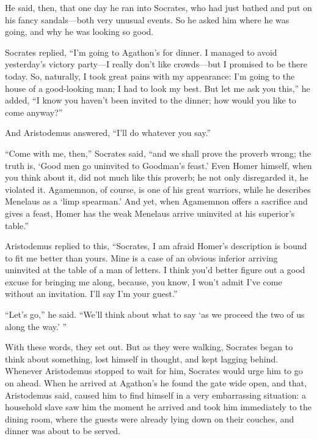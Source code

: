 He said, then, that one day he ran into Socrates, who had just bathed
and put on his fancy sandals---both very unusual events. So he asked him
where he was going, and why he was looking so good.

Socrates replied, “I'm going to Agathon's for dinner. I managed to avoid
yesterday's victory party---I really don't like crowds---but I promised
to be there today. So, naturally, I took great pains with my appearance:
I'm going to the house of a good-looking man; I had to look my best. But
let me ask you this,” he added, “I know you haven't been invited to the
dinner; how would you like to come anyway?”

And Aristodemus answered, “I'll do whatever you say.”

“Come with me, then,” Socrates said, “and we shall prove the proverb
wrong; the truth is, ‘Good men go uninvited to Goodman's
feast.' Even Homer
himself, when you think about it, did not much like this proverb;
he not only disregarded it, he violated it. Agamemnon, of
course, is one of his great warriors, while he describes Menelaus as a
‘limp spearman.' And yet, when Agamemnon offers a sacrifice and gives a
feast, Homer has the weak Menelaus arrive uninvited at his superior's
table.”

Aristodemus replied to this, “Socrates, I am afraid Homer's description
is bound to fit me better than yours. Mine is a case of an obvious
inferior arriving uninvited at the table of a man of letters. I think
you'd better figure out a good excuse for bringing me along, because,
you know, I  won't admit I've come without an invitation. I'll
say I'm your guest.”

“Let's go,” he said. “We'll think about what to say ‘as we proceed the
two of us along the way.'
”

With these words, they set out. But as they were walking, Socrates began
to think about something, lost himself in thought, and kept lagging
behind. Whenever Aristodemus stopped to wait for him, Socrates would
urge him  to go on ahead. When he arrived at Agathon's he found
the gate wide open, and that, Aristodemus said, caused him to find
himself in a very embarrassing situation: a household slave saw him the
moment he arrived and took him immediately to the dining room, where the
guests were already lying down on their couches, and dinner was about to
be served.

